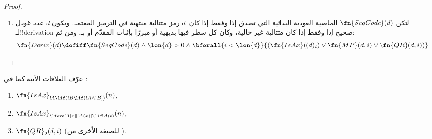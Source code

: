 \documentclass[../../../include/open-logic-section]{subfiles}
\begin{document}
\begin{proof}
\begin{enumerate}
\begin{enumerate}
  \item يشتمل السطر $i$ على $!B\lif\lforall[x][!A(x)]$، و
  \item يشتمل سطر ما $j<i$ على $!B\lif\Subst{!A}{c}{x}$ لثابت~$c$
  \item لا يرد في~$!B$.
  \end{enumerate}
  ويمكن اختبار هذه الشروط كلها عوديًا بدائيًا، لأن أعداد غودل
  لـ$!B$ و$!A(x)$ و$x$ أصغر من عدد غودل للصيغة في السطر~$i$، وعدد
  غودل لـ$c$ أصغر من عدد غودل للصيغة في السطر~$j$:
  \begin{multline*}
    \fn{QR}_1(d, i) \defiff \bexists{j<i}{\bexists{b < (d)_i}{\bexists{x <
        (d)_i}{\bexists{a < (d)_i}{\bexists{c < (d)_j}{(}}}}}
    \\ \fn{Var}(x) \land \fn{Const}(c) \land {} \\
    (d)_i = \Gn{(} \concat
    b \concat \Gn{\lif} \concat \Gn{\lforall} \concat x \concat a
    \concat \Gn{)} \land {}\\
    (d)_j = \Gn{(} \concat b \concat
    \Gn{\lif} \concat \fn{Subst}(a,c,x) \concat \Gn{)} \land {}\\ \fn{Sent}(b)
    \land \fn{Sent}(\fn{Subst}(a,c,x)) \land {} \bforall{k <
      \len{b}}{(b)_k \neq (c)_0})
  \end{multline*}
  وهنا نفترض أن $c$ و$x$ هما عددا غودل للثابت والمتغير بوصفهما حدين
  (لا شفرتي رمزيهما). ونختبر أن $x$ هو المتغير الحر الوحيد في~$!A(x)$
  باختبار ما إذا كانت $\Subst{!A(x)}{c}{x}$ !!a{sentence}، ونضمن عدم
  ورود $c$ في $!B$ باشتراط اختلاف كل رمز في~$!B$ عن~$c$.

  ونترك الصيغة الأخرى من \QR{} تمرينًا.
\item لتكن $\fn{SeqCode}(d)$ الخاصية العودية البدائية التي تصدق إذا
  وفقط إذا كان~$d$ رمز متتالية منتهية في الترميز المعتمد. ويكون $d$
  عدد غودل لـ!!{derivation} صحيح إذا وفقط إذا كان متتالية غير خالية،
  وكان كل سطر فيها بديهية أو مبررًا بإثبات المقدّم أو بـ\QR. ومن ثم:
  \[
  \fn{Deriv}(d) \defiff \fn{SeqCode}(d) \land \len{d}>0 \land
  \bforall{i < \len{d}}{(\fn{IsAx}((d)_i) \lor
    \fn{MP}(d,i) \lor \fn{QR}(d, i))}
  \]
\end{enumerate}
\end{proof}

\begin{prob}
عرّف العلاقات الآتية كما في
:
\begin{enumerate}
\item $\fn{IsAx}_{!A \lif (!B \lif (!A \land !B))}(n)$,
\item $\fn{IsAx}_{\lforall[x][!A(x)] \lif !A(t)}(n)$,
\item $\fn{QR}_{2}(d, i)$ (للصيغة الأخرى من \QR).
\end{enumerate}
\end{prob}
\end{document}
